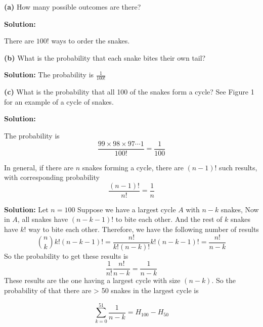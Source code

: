 \documentclass[11pt]{article}
\renewcommand\part[1]{\vspace{.10in}\textbf{(#1)}}
\newcommand{\solution}{\vspace{.10in}\textbf{Solution: }}
\begin{document}
\part{a} How many possible outcomes are there?

\solution

There are $100!$ ways to order the snakes.

\part{b} What is the probability that each snake bites their own tail?

\solution
The probability is $\frac{1}{100!}$

\part{c}
What is the probability that all 100 of the snakes form a cycle? See Figure 1 for an example of a cycle of snakes.

\solution

The probability is
\begin{equation*}
  \frac{99\times 98 \times 97\cdots 1}{100!} = \frac{1}{100}
\end{equation*}

In general, if there are $n$ snakes forming a cycle, there are $(n-1)!$ such results, with corresponding probability
\[\frac{(n-1)!}{n!}=\frac{1}{n}\]


\solution
Let $n=100$
Suppose we have a largest cycle $A$ with $n-k$ snakes, Now in $A$, all snakes have $(n-k-1)!$ to bite each other.
And the rest of $k$ snakes have $k!$ way to bite each other. Therefore, we have the following number of results
\[\binom{n}{k} k!(n-k-1)!=\frac{n!}{k!(n-k)!} k!\left( n-k-1\right)  !=\frac{n!}{n-k}\]
So the probability to get these results is
\[\frac{1}{n!}\frac{n!}{n-k} = \frac{1}{n-k}\]
These results are the one having a largest cycle with size $(n-k)$.
So the probability of that there are > 50 snakes in the largest cycle is

\begin{equation*}
  \sum_{k=0}^{51} \frac{1}{n-k} = H_{100} - H_{50}
\end{equation*}
\end{document}
